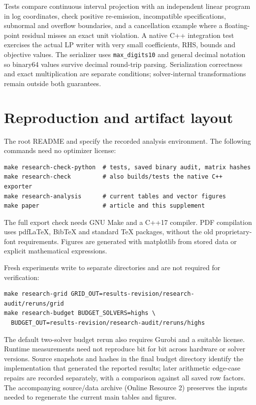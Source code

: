 \documentclass[11pt]{article}
\begin{document}
Tests compare continuous interval projection with an independent linear program in
log coordinates, check positive re-emission, incompatible specifications, subnormal
and overflow boundaries, and a cancellation example where a floating-point residual
misses an exact unit violation. A native C++ integration test exercises the actual
LP writer with very small coefficients, RHS, bounds and objective values. The
serializer uses \texttt{max\_digits10} and general decimal notation so binary64
values survive decimal round-trip parsing. Serialization correctness and exact
multiplication are separate conditions; solver-internal transformations remain
outside both guarantees.

\section{Reproduction and artifact layout}
The root README and  specify the
recorded analysis environment. The following commands need no optimizer license:
\begin{lstlisting}
make research-check-python  # tests, saved binary audit, matrix hashes
make research-check         # also builds/tests the native C++ exporter
make research-analysis      # current tables and vector figures
make paper                  # article and this supplement
\end{lstlisting}
The full export check needs GNU Make and a C++17 compiler. PDF compilation uses
pdfLaTeX, BibTeX and standard TeX packages, without the old proprietary-font
requirements. Figures are generated with matplotlib from stored data or explicit
mathematical expressions.

Fresh experiments write to separate directories and are not required for verification:
\begin{lstlisting}
make research-grid GRID_OUT=results-revision/research-audit/reruns/grid
make research-budget BUDGET_SOLVERS=highs \
  BUDGET_OUT=results-revision/research-audit/reruns/highs
\end{lstlisting}
The default two-solver budget rerun also requires Gurobi and a suitable license.
Runtime measurements need not reproduce bit for bit across hardware or solver
versions. Source snapshots and hashes in the final budget directory identify the
implementation that generated the reported results; later arithmetic edge-case
repairs are recorded separately, with a comparison against all saved row factors.
The accompanying source/data archive (Online Resource 2) preserves the inputs needed
to regenerate the current main tables and figures.
\end{document}
